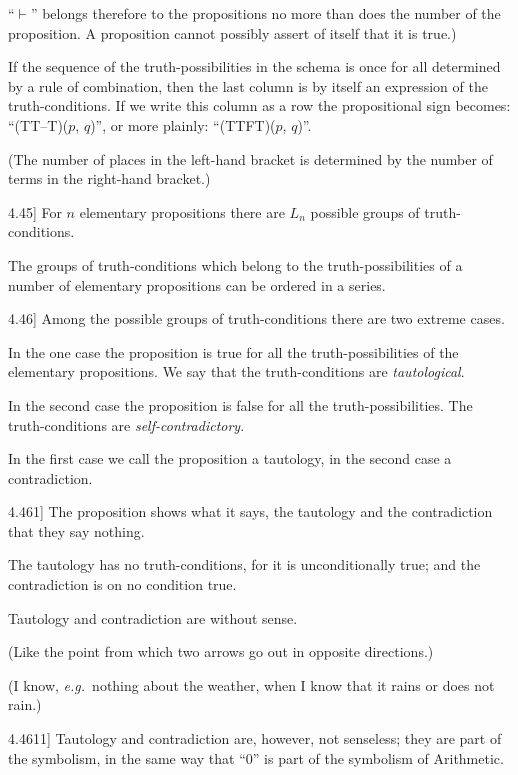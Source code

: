 \documentclass[12pt,oneside]{book}[2007/10/19]
\newcommand{\PropositionE}[2]{%
  \item[\phantomsection\label{PropE:#1}\PropGRef{#1}] #2%
}
\newcommand{\PropGRef}[1]{\hyperref[PropG:#1]{#1}}
\newcommand{\exempliGratia}{\textit{e.g.}}
\begin{document}
\begin{propositions}
{``$\vdash$'' belongs therefore to the propositions no
more than does the number of the proposition. A
proposition cannot possibly assert of itself that it
is true.)

If the sequence of the truth-possibilities in the
schema is once for all determined by a rule of
combination, then the last column is by itself an
expression of the truth-conditions. If we write
this column as a row the propositional sign becomes:
``(TT--T)($p$, $q$)'', or more plainly: ``(TTFT)($p$, $q$)''.

(The number of places in the left-hand bracket
is determined by the number of terms in the right-hand
bracket.)}


\PropositionE{4.45}
{For $n$ elementary propositions there are $L_{n}$
possible groups of truth-con\-di\-tions.

The groups of truth-conditions which belong to
the truth-pos\-si\-bil\-i\-ties of a number of elementary
propositions can be ordered in a series.}


\PropositionE{4.46}
{Among the possible groups of truth-conditions
there are two extreme cases.

In the one case the proposition is true for all the
truth-pos\-si\-bil\-i\-ties of the elementary propositions.
We say that the truth-conditions are \emph{tautological}.

In the second case the proposition is false for all
the truth-pos\-si\-bil\-i\-ties. The truth-conditions are
\emph{self-contradictory}.

In the first case we call the proposition a
tautology, in the second case a contradiction.}


\PropositionE{4.461}
{The proposition shows what it says, the
tautology and the contradiction that they say
nothing.

The tautology has no truth-conditions, for it is
unconditionally true; and the contradiction is on
no condition true.

Tautology and contradiction are without sense.

(Like the point from which two arrows go out in
opposite directions.)

(I know, \exempliGratia\ nothing about the weather, when
I know that it rains or does not rain.)}


\PropositionE{4.4611}
{Tautology and contradiction are, however, not
senseless; they are part of the symbolism, in the
same way that ``0'' is part of the symbolism of
Arithmetic.}



\end{propositions}
\end{document}
